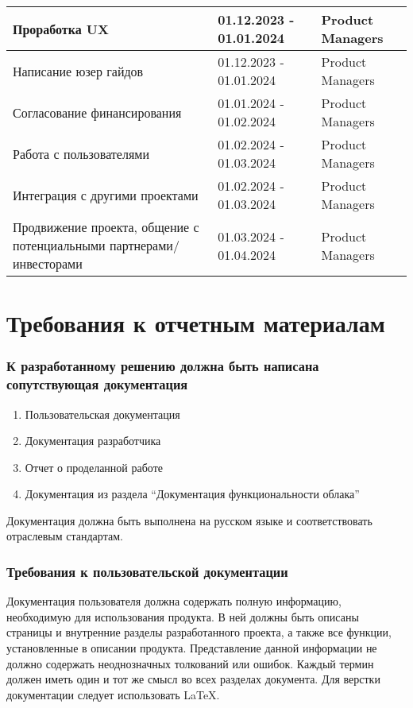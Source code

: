 \documentclass[14pt, a4paper]{extarticle}
\begin{document}
\begin{center}
\begin{longtable}{|D{0.4\textwidth}|D{0.2\textwidth}|D{0.3\textwidth}|}
\hline
Проработка UX & 01.12.2023 - 01.01.2024 & Product Managers \\
\hline
Написание юзер гайдов & 01.12.2023 - 01.01.2024 & Product Managers \\
\hline
Согласование финансирования & 01.01.2024 - 01.02.2024 & Product Managers \\
\hline
Работа с пользователями & 01.02.2024 - 01.03.2024 & Product Managers \\
\hline
Интеграция с другими проектами & 01.02.2024 - 01.03.2024 & Product Managers \\
\hline
Продвижение проекта, общение с потенциальными партнерами/инвесторами & 01.03.2024 - 01.04.2024 & Product Managers \\
\hline
\end{longtable}
\end{center}


\pagebreak

\section{Требования к отчетным материалам}

\subsubsection*{К разработанному решению должна быть написана сопутствующая документация}

\begin{enumerate}
\item Пользовательская документация
\item Документация разработчика
\item Отчет о проделанной работе
\item Документация из раздела “Документация функциональности облака”
\end{enumerate}

Документация должна быть выполнена на русском языке и соответствовать отраслевым стандартам.

\subsubsection*{Требования к пользовательской документации}

Документация пользователя должна содержать полную информацию, необходимую для использования продукта. В ней должны быть описаны страницы и внутренние разделы разработанного проекта, а также все функции, установленные в описании продукта. Представление данной информации не должно содержать неоднозначных толкований или ошибок. Каждый термин должен иметь один и тот же смысл во всех разделах документа.
Для верстки документации следует использовать LaTeX.
\end{document}
